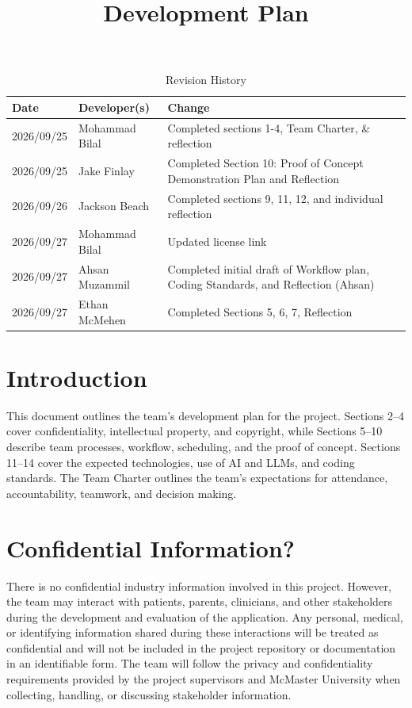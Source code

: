 \documentclass{article}
\title{Development Plan\\\progname}
\author{\authname}
\date{}
\begin{document}
\maketitle

\newpage{}

\begin{table}[hp]
\caption{Revision History} \label{TblRevisionHistory}
\begin{tabularx}{\textwidth}{llX}
\toprule
\textbf{Date} & \textbf{Developer(s)} & \textbf{Change}\\
\midrule
2026/09/25 & Mohammad Bilal & Completed sections 1-4, Team Charter, \& reflection \\
2026/09/25 & Jake Finlay & Completed Section 10: Proof of Concept Demonstration Plan and Reflection \\
2026/09/26 & Jackson Beach & Completed sections 9, 11, 12, and individual reflection \\
2026/09/27 & Mohammad Bilal & Updated license link \\
2026/09/27 & Ahsan Muzammil & Completed initial draft of Workflow plan, Coding Standards, and Reflection (Ahsan)\\
2026/09/27 & Ethan McMehen & Completed Sections 5, 6, 7, Reflection \\
\bottomrule
\end{tabularx}
\end{table}

\newpage{}

\section{Introduction}

This document outlines the team's development plan for the project.
Sections 2--4 cover confidentiality, intellectual property, and copyright,
while Sections 5--10 describe team processes, workflow, scheduling, and the proof of concept.
Sections 11--14 cover the expected technologies, use of AI and LLMs, and coding standards.
The Team Charter outlines the team's expectations for attendance, accountability, teamwork, and decision making.

\section{Confidential Information?}

There is no confidential industry information involved in this project.
However, the team may interact with patients, parents, clinicians, and other
stakeholders during the development and evaluation of the application.
Any personal, medical, or identifying information shared during these interactions
will be treated as confidential and will not be included in the project repository
or documentation in an identifiable form. The team will follow the privacy and
confidentiality requirements provided by the project supervisors and McMaster
University when collecting, handling, or discussing stakeholder information.
\end{document}
